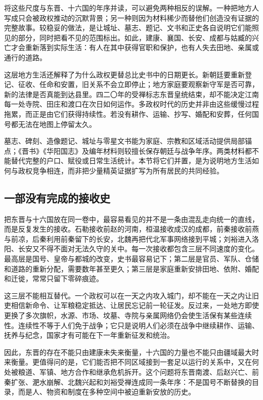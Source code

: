 将这些尺度与东晋、十六国的年序并读，可以避免两种相反的误解。一种把地方人写成只会被政权推动的沉默背景；另一种则因为材料稀少而替他们创造没有证据的完整故事。较稳妥的做法，是让城址、墓志、题记、文书和正史各自说明它们能照见的部分，同时把看不见的范围标出。如此，建康、襄国、长安、成都与姑臧的兴亡才会重新落到实际生活：有人在其中获得官职和保护，也有人失去田地、亲属或通行的道路。

这层地方生活还解释了为什么政权更替总比史书中的日期更长。新朝廷要重新登记、征收、任命和安置，旧关系不会立即停止；地方家庭要观察新守军是否可靠，新的法律是否真能到达县里。四二〇年的受禅标志东晋皇统结束，却不能决定江南每一处寺院、田庄和渡口在次日如何运作。多政权时代的历史并非由这些缓慢过程拖累，而正是由它们获得持续性。若没有耕作、运输、抄写、婚配和安葬，任何国号都无法在地图上停留太久。

\begin{sourcenote}[地方社会的可见与不可见]
墓志、碑刻、造像题记、城址与零星文书能为家庭、宗教和区域活动提供局部锚点；《晋书》《华阳国志》及编年材料则较擅长保存朝廷与战争年序。两类材料都不能替代完整的户口、赋役或日常生活统计。本节将它们并置，是为说明地方生活如何与政权竞争相连，而非把少量精英证据扩写为所有居民的共同经验。
\end{sourcenote}

\subsection{一部没有完成的接收史}

把东晋与十六国放在同一卷中，最容易看见的并不是一条由混乱走向统一的直线，而是反复发生的接收。石勒接收前赵的河南，桓温接收成汉的成都，前秦接收前燕与前凉，后秦利用前秦留下的长安，北魏再把代北军事网络接到平城；刘裕进入洛阳、长安又不得不面对无法久守的关中。每一次接收都包含三层不同速度的变化。最高层是国号、皇帝与都城的改变，史书最容易记下；第二层是官员、军队、仓储和道路的重新分配，需要数年甚至更久；第三层是家庭重新安排田地、依附、婚配和迁徙，常常只留下零碎痕迹。

这三层不能相互替代。一个政权可以在一天之内攻入城门，却不能在一天之内让旧吏相信新命令、让军粮稳定抵达、让居民忘记前一轮征发。反过来，一处地方即使更换了多次旗帜，水源、市场、坟墓、寺院与亲属网络仍会使生活保有某些连续性。连续性不等于人们免于战争；它只是说明人们必须在战争中继续耕作、运输、抚养与纪念，国家才有可能在下一年重新征发和统治。

因此，东晋的存在不能只由建康未失来衡量，十六国的力量也不能只由疆域最大时来衡量。更值得问的是，它们能否把不同区域接到一套足以运行的关系中，又在何处被粮道、军镇、地方合作和继承危机拆开。这个问题将东晋南渡、后赵兴亡、前秦扩张、淝水崩解、北魏兴起和刘裕受禅连成同一条年序：不是国号不断替换的目录，而是人、物资和制度在多种空间中被迫重新安放的历史。

